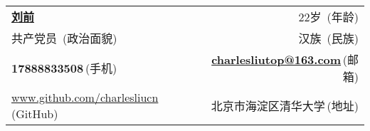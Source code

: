 \newcommand{\myheader}{
\begin{tabular*}{\textwidth}{l@{\extracolsep{\fill}}r}
  \textbf{\href{http://www.github.com/charlesliucn}{\LARGE 刘前}} & 22岁$\,$ {\color{labelgrey}(年龄)} \\
  共产党员 $\,${\color{labelgrey}(政治面貌)} & 汉族 $\,${\color{labelgrey}(民族)}\\
  \textbf{17888833508}$\,${\color{labelgrey}(手机)} & \href{mailto:charlesliutop@163.com}{\textbf{charlesliutop@163.com}}$\,${\color{labelgrey}(邮箱)}\\
  \href{http://www.github.com/charlesliucn}{www.github.com/charlesliucn}$\,${\color{labelgrey}(GitHub)} & 北京市海淀区清华大学$\,${\color{labelgrey}(地址)}\\
  \end{tabular*}\\\vspace{0.15in}}

\myheader